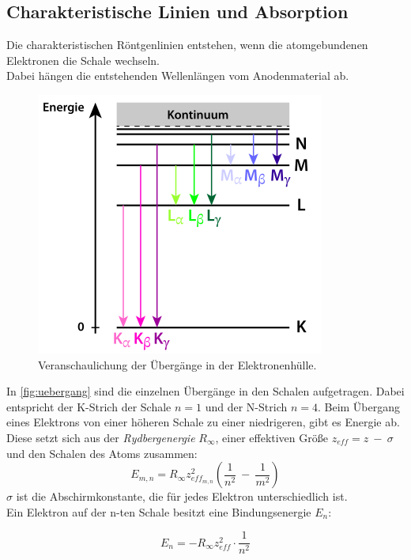 \subsection{Charakteristische Linien und Absorption}

Die charakteristischen Röntgenlinien entstehen, wenn die atomgebundenen Elektronen die Schale wechseln.\\
Dabei hängen die entstehenden Wellenlängen vom Anodenmaterial ab.

\begin{figure}[htbp]
    \centering
    \includegraphics[scale=0.6]{content/992Charakteristische Röntgenstrahlung- Bezeichnungen der Übergänge.png}
    \caption{Veranschaulichung der Übergänge in der Elektronenhülle\cite{leifi}.}
    \label{fig:uebergang}
\end{figure}

In \autoref{fig:uebergang} sind die einzelnen Übergänge in den Schalen aufgetragen.
Dabei entspricht der K-Strich der Schale $n=1$ und der N-Strich $n=4$.
Beim Übergang eines Elektrons von einer höheren Schale zu einer niedrigeren, gibt es Energie ab.
Diese setzt sich aus der \textit{Rydbergenergie} $R_{\infty}$, einer effektiven Größe $z_{eff} = z\ -\ \sigma$ und den Schalen des Atoms zusammen:
\begin{equation}
    E_{m,n} = R_{\infty}z_{eff_{m,n}}^2\left(\frac{1}{n^2}\ -\ \frac{1}{m^2}\right)
    \label{eq:enrgy}
\end{equation}
$\sigma$ ist die Abschirmkonstante, die für jedes Elektron unterschiedlich ist.\\
Ein Elektron auf der n-ten Schale besitzt eine Bindungsenergie $E_n$:

\begin{equation}
    E_n = -R_{\infty}z_{eff}^2\cdot\frac{1}{n^2}
    \label{eq:bind}
\end{equation}

